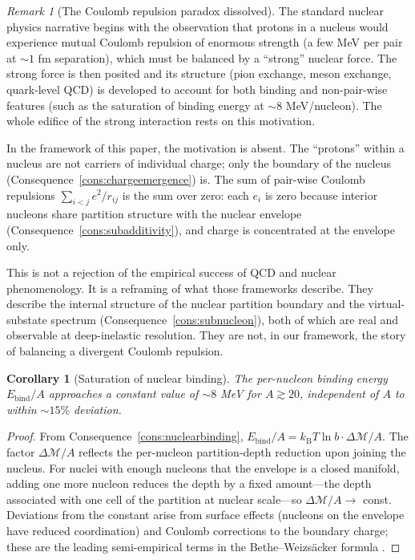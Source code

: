 \documentclass[11pt,twocolumn,a4paper]{article}
\theoremstyle{axiomstyle}
\theoremstyle{conseqstyle}
\newtheorem{corollary}{Corollary}
\theoremstyle{definition}
\theoremstyle{remark}
\newtheorem*{remark}{Remark}
\newcommand{\kB}{k_{\mathrm{B}}}
\newcommand{\Depth}{\mathcal{M}}
\begin{document}
\begin{remark}[The Coulomb repulsion paradox dissolved]
The standard nuclear physics narrative begins with the observation that protons in a nucleus would experience mutual Coulomb repulsion of enormous strength (a few MeV per pair at $\sim 1$ fm separation), which must be balanced by a ``strong'' nuclear force. The strong force is then posited and its structure (pion exchange, meson exchange, quark-level QCD) is developed to account for both binding and non-pair-wise features (such as the saturation of binding energy at $\sim 8$ MeV/nucleon). The whole edifice of the strong interaction rests on this motivation.

In the framework of this paper, the motivation is absent. The ``protons'' within a nucleus are not carriers of individual charge; only the boundary of the nucleus (Consequence~\ref{cons:chargeemergence}) is. The sum of pair-wise Coulomb repulsions $\sum_{i<j}e^{2}/r_{ij}$ is the sum over zero: each $e_{i}$ is zero because interior nucleons share partition structure with the nuclear envelope (Consequence~\ref{cons:subadditivity}), and charge is concentrated at the envelope only.

This is not a rejection of the empirical success of QCD and nuclear phenomenology. It is a reframing of what those frameworks describe. They describe the internal structure of the nuclear partition boundary and the virtual-substate spectrum (Consequence~\ref{cons:subnucleon}), both of which are real and observable at deep-inelastic resolution. They are not, in our framework, the story of balancing a divergent Coulomb repulsion.
\end{remark}

\begin{corollary}[Saturation of nuclear binding]
\label{cor:saturation}
The per-nucleon binding energy $E_{\text{bind}}/A$ approaches a constant value of $\sim 8$ MeV for $A\gtrsim 20$, independent of $A$ to within $\sim 15\%$ deviation.
\end{corollary}

\begin{proof}
From Consequence~\ref{cons:nuclearbinding}, $E_{\text{bind}}/A=\kB T\ln b\cdot\Delta\Depth/A$. The factor $\Delta\Depth/A$ reflects the per-nucleon partition-depth reduction upon joining the nucleus. For nuclei with enough nucleons that the envelope is a closed manifold, adding one more nucleon reduces the depth by a fixed amount---the depth associated with one cell of the partition at nuclear scale---so $\Delta\Depth/A\to$ const. Deviations from the constant arise from surface effects (nucleons on the envelope have reduced coordination) and Coulomb corrections to the boundary charge; these are the leading semi-empirical terms in the Bethe--Weizs\"acker formula \citep{krane1988}.
\end{proof}
\end{document}

